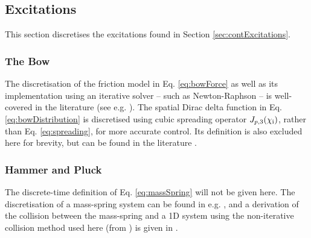 \documentclass{article}
\begin{document}
\subsection{Excitations}\label{sec:discExcitations}
This section discretises the excitations found in Section \ref{sec:contExcitations}. 

\subsubsection{The Bow}
The discretisation of the friction model in Eq. \eqref{eq:bowForce} as well as its implementation using an iterative solver -- such as Newton-Raphson -- is well-covered in the literature (see e.g. \cite[Ch. 8]{WillemsenThesis}). The spatial Dirac delta function in Eq. \eqref{eq:bowDistribution} is discretised using cubic spreading operator $J_{p,3}(\chi_{\text{i}})$, rather than Eq. \eqref{eq:spreading}, for more accurate control. Its definition is also excluded here for brevity, but can be found in the literature \cite[Sec. 5.2.4]{theBible}.

\subsubsection{Hammer and Pluck}\label{sec:hammerPluck}
The discrete-time definition of Eq. \eqref{eq:massSpring} will not be given here. The discretisation of a mass-spring system can be found in e.g. \cite{Bilbao2009Modular, Willemsen2020}, and a derivation of the collision between the mass-spring and a 1D system using the non-iterative collision method used here (from \cite{Ducceschi2021}) is given in \cite[Sec. 10.2]{WillemsenThesis}.
\end{document}
